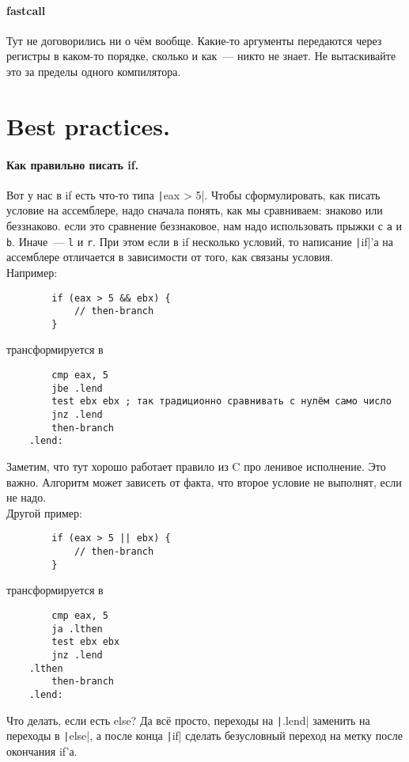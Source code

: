 \documentclass{article}
\begin{document}
    \paragraph{fastcall}
    Тут не договорились ни о чём вообще. Какие-то аргументы передаются через регистры в каком-то порядке, сколько и как~--- никто не знает. Не вытаскивайте это за пределы одного компилятора.
    \section{Best practices.}
    \paragraph{Как правильно писать if.}
    Вот у нас в if есть что-то типа \texttt|eax > 5|. Чтобы сформулировать, как писать условие на ассемблере, надо сначала понять, как мы сравниваем: знаково или беззнаково. если это сравнение беззнаковое, нам надо использовать прыжки с \Verb|a| и \Verb|b|. Иначе~--- \Verb|l| и \Verb|r|. При этом если в if несколько условий, то написание \texttt|if|'а на ассемблере отличается в зависимости от того, как связаны условия.\\
    Например:
    \begin{verbatim}
        if (eax > 5 && ebx) {
            // then-branch
        }
    \end{verbatim}
    трансформируется в
    \begin{verbatim}
        cmp eax, 5
        jbe .lend
        test ebx ebx ; так традиционно сравнивать с нулём само число
        jnz .lend
        then-branch
    .lend:
    \end{verbatim}
    Заметим, что тут хорошо работает правило из C про ленивое исполнение. Это важно. Алгоритм может зависеть от факта, что второе условие не выполнят, если не надо.\\
    Другой пример:
    \begin{verbatim}
        if (eax > 5 || ebx) {
            // then-branch
        }
    \end{verbatim}
    трансформируется в
    \begin{verbatim}
        cmp eax, 5
        ja .lthen
        test ebx ebx
        jnz .lend
    .lthen
        then-branch
    .lend:
    \end{verbatim}
    Что делать, если есть else? Да всё просто, переходы на \texttt|.lend| заменить на переходы в \texttt|else|, а после конца \texttt|if| сделать безусловный переход на метку после окончания if'а.\\
\end{document}

